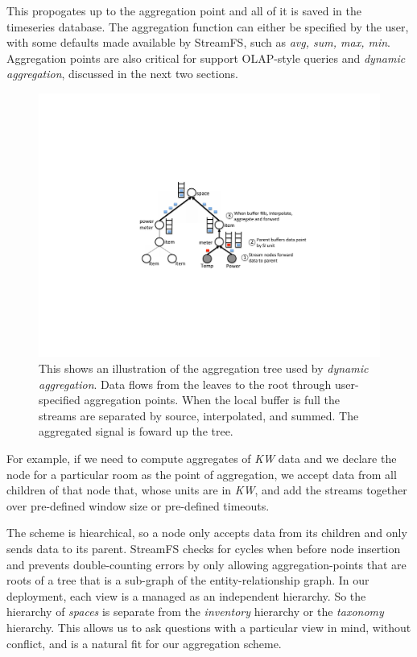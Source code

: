 This propogates up to the aggregation point and all of it is saved in the timeseries database.  The aggregation function
can either be specified by the user, with some defaults made available by StreamFS, such as \emph{avg, sum, max, min}.
Aggregation points are also critical for support OLAP-style queries and \emph{dynamic aggregation}, discussed in
the next two sections.

\begin{figure}[htb!]
\begin{center}
\includegraphics[scale=0.6]{figs/aggtree}
\caption{This shows an illustration of the aggregation tree used by \emph{dynamic aggregation}.  Data flows from 
the leaves to the root through user-specified aggregation points.  When the local buffer is full the streams
are separated by source, interpolated, and summed.  The aggregated signal is foward up the tree.}
\label{fig:aggtree}
\end{center}
\end{figure}

For example,
if we need to compute aggregates of \emph{KW} data and we declare the node for a particular room as
the point of aggregation, we accept data from all children of that node that, whose units are in \emph{KW},
and add the streams together over pre-defined window size or pre-defined timeouts.

The scheme is hiearchical, so a node only accepts data from its children and only sends data to its parent.
StreamFS checks for cycles when before node insertion and prevents double-counting errors by only allowing 
aggregation-points that are roots of a tree that is a sub-graph of the entity-relationship graph.  In our deployment,
each view is a managed as an independent hierarchy.  So the hierarchy of \emph{spaces} is separate from
the \emph{inventory} hierarchy or the \emph{taxonomy} hierarchy.  This allows us to ask questions with a particular
view in mind, without conflict, and is a natural fit for our aggregation scheme.

